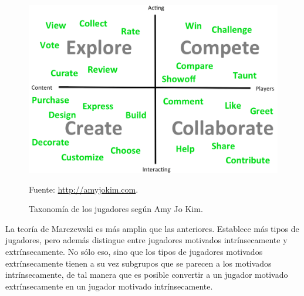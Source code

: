 \begin{figure}[hbt]
\begin{center}
\caption{Taxonomía de los jugadores según Amy Jo Kim.}
\label{fig::AmyJoKim}
\includegraphics[scale=0.25]{img/AmyJoKim.png}

\vspace{-0.25cm}
\small{Fuente: \url{http://amyjokim.com}.}
\end{center}
\end{figure}


La teoría de Marczewski  \cite{marczewski} es más amplia que las anteriores.
%
Establece más tipos de jugadores, pero además distingue entre jugadores motivados intrínsecamente y extrínsecamente.
%
No sólo eso, sino que los tipos de jugadores motivados extrínsecamente tienen a su vez subgrupos que se parecen a los motivados intrínsecamente, de tal manera que es posible convertir a un jugador motivado extrínsecamente en un jugador motivado intrínsecamente.

